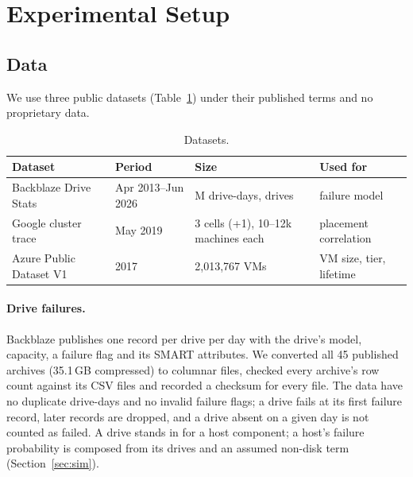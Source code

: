 \documentclass[pdflatex,sn-mathphys-num,iicol]{sn-jnl}
\theoremstyle{thmstyleone}%
\theoremstyle{thmstylethree}%
\begin{document}
\section{Experimental Setup}\label{sec:setup}

\subsection{Data}\label{sec:data}

We use three public datasets (Table~\ref{tab:data}) under their published terms and no
proprietary data.

\begin{table}[!t]\centering
\caption{Datasets.}\label{tab:data}
\setlength{\tabcolsep}{4pt}\footnotesize
\begin{tabular}{p{}p{}p{}p{}}\toprule
Dataset & Period & Size & Used for \\ \midrule
Backblaze Drive Stats~\cite{backblaze2026drivestats} & Apr 2013--Jun 2026 & \VDriveDaysM{}M drive-days, \VDrives{} drives & failure model \\
Google cluster trace~\cite{googleclusterdata2019,tirmazi2020borg} & May 2019 & 3 cells (+1), 10--12k machines each & placement correlation \\
Azure Public Dataset V1~\cite{azurepublicdataset,cortez2017resource} & 2017 & 2{,}013{,}767 VMs & VM size, tier, lifetime \\
\bottomrule\end{tabular}
\end{table}

\paragraph{Drive failures.} Backblaze publishes one record per drive per day with the drive's
model, capacity, a failure flag and its SMART attributes. We converted all 45 published archives
(35.1\,GB compressed) to columnar files, checked every archive's row count against its CSV files
and recorded a checksum for every file. The data have no duplicate drive-days and no invalid
failure flags; a drive fails at its first failure record, later records are dropped, and a drive
absent on a given day is not counted as failed. A drive stands in for a host component; a host's
failure probability is composed from its drives and an assumed non-disk term
(Section~\ref{sec:sim}).
\end{document}
